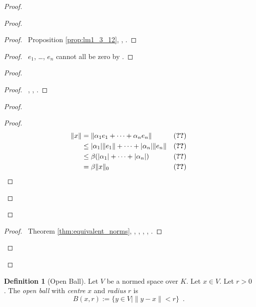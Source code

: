 \documentclass{book}
\let\qed\relax
\theoremstyle{definition}
\newtheorem{df}[ax]{Definition}
\begin{document}
\begin{proof}
\begin{proof}
	\begin{proof}
		\pf\ Proposition \ref{prop:lm1_3_12}, , .
	\end{proof}
	\begin{proof}
		\pf\ $e_1$, \ldots, $e_n$ cannot all be zero by .
	\end{proof}
	\begin{proof}
		\begin{proof}
			\pf\ , , .
		\end{proof}
		\begin{proof}
			\qedstep
			\begin{proof}
				\pf
				\begin{align*}
					\|x\| & = \|\alpha_1 e_1 + \cdots + \alpha_n e_n\| & (\text{\stepref{one}}) \\
					& \leq |\alpha_1| \|e_1\| + \cdots + |\alpha_n| \|e_n\| & (\text{\stepref{a}}) \\
					& \leq \beta (|\alpha_1| + \cdots + |\alpha_n|) & (\text{\stepref{c}}) \\
					& = \beta \|x\|_0 & (\text{\stepref{3}})
				\end{align*}
			\end{proof}
		\end{proof}
	\end{proof}
	\qedstep
	\begin{proof}
		\pf\ Theorem \ref{thm:equivalent_norms}, , , , , .
	\end{proof}
\end{proof}
\qed
\end{proof}

\begin{df}[Open Ball]
Let $V$ be a normed space over $K$. Let $x \in V$. Let $r > 0$. The \emph{open ball} with \emph{centre} $x$ and \emph{radius} $r$ is
\[ B(x,r) := \{ y \in V \mid \| y-x\| < r \} \enspace . \]
\end{df}
\end{document}
